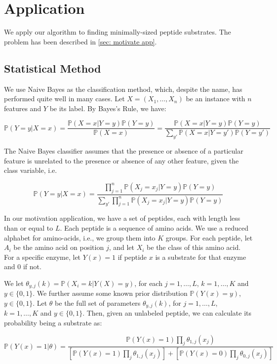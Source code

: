 \documentclass[11pt]{article}
\newcommand{\Prob}{\mathbb{P}}
\begin{document}
\section{Application}
We apply our algorithm to finding minimally-sized peptide substrates. The problem has been described in \ref{sec: motivate app}.

\subsection{Statistical Method}
We use Naive Bayes as the classification method, which, despite the name, has performed quite well in many cases. Let $X=(X_1,\ldots,X_n)$ be an instance with $n$ features and $Y$ be its label. By Bayes's Rule, we have:

\begin{equation*}
\Prob(Y=y|X=x)=\frac{\Prob(X=x|Y=y)\Prob(Y=y)}{\Prob(X=x)}=\frac{\Prob(X=x|Y=y)\Prob(Y=y)}{\sum_{y'}\Prob(X=x|Y=y')\Prob(Y=y')}
\end{equation*}

The Naive Bayes classifier assumes that the presence or absence of a particular feature is unrelated to the presence or absence of any other feature, given the class variable, i.e.

\begin{equation*}
\Prob(Y=y|X=x) = \frac{\prod_{j=1}^n\Prob(X_j=x_j|Y=y)\Prob(Y=y)}{\sum_{y'}\prod_{j=1}^n\Prob(X_j=x_j|Y=y)\Prob(Y=y)}
\end{equation*}

In our motivation application, we have a set of peptides, each with length less than or equal to $L$. Each peptide is a sequence of amino acids. We use a reduced alphabet for amino-acids, i.e., we group them into $K$ groups. For each peptide, let $A_i$ be the amino acid on position $j$, and let $X_i$ be the class of this amino acid. For a specific enzyme, let $Y(x)=1$ if peptide $x$ is a substrate for that enzyme and 0 if not.

We let $\theta_{y,j}(k)=\Prob(X_i=k|Y(X)=y)$, for each $j=1,\ldots,L$, $k=1,\ldots,K$ and $y\in\{0,1\}$. We further assume some known prior distribution $\Prob(Y(x)=y)$, $y\in\{0,1\}$. Let $\theta$ be the full set of parameters $\theta_{y,j}(k)$, for $j=1,\ldots,L$, $k=1,\ldots,K$ and $y\in\{0,1\}$. Then, given an unlabeled peptide, we can calculate its probability being a substrate as:

\begin{equation} \label{eq:model}
  \Prob\left(Y(x) = 1 | \theta\right) =
  \frac{\Prob(Y(x)=1) \prod_{j} \theta_{1,j}(x_j)}{
  \left[ \Prob(Y(x)=1) \prod_{j} \theta_{1,j}(x_j)\right] +
  \left[ \Prob(Y(x)=0) \prod_{j} \theta_{0,j}(x_j)\right]}
\end{equation}
\end{document}
